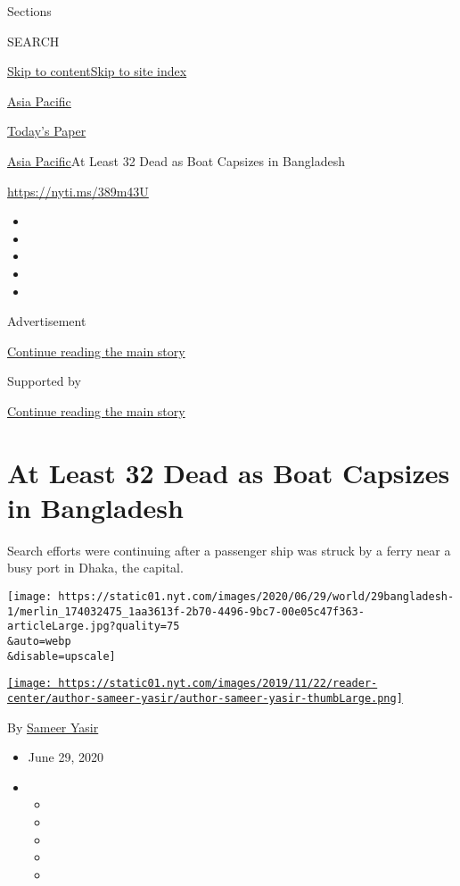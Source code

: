 Sections

SEARCH

\protect\hyperlink{site-content}{Skip to
content}\protect\hyperlink{site-index}{Skip to site index}

\href{https://www.nytimes.com/section/world/asia}{Asia Pacific}

\href{https://myaccount.nytimes.com/auth/login?response_type=cookie\&client_id=vi}{}

\href{https://www.nytimes.com/section/todayspaper}{Today's Paper}

\href{/section/world/asia}{Asia Pacific}\textbar{}At Least 32 Dead as
Boat Capsizes in Bangladesh

\url{https://nyti.ms/389m43U}

\begin{itemize}
\item
\item
\item
\item
\item
\end{itemize}

Advertisement

\protect\hyperlink{after-top}{Continue reading the main story}

Supported by

\protect\hyperlink{after-sponsor}{Continue reading the main story}

\hypertarget{at-least-32-dead-as-boat-capsizes-in-bangladesh}{%
\section{At Least 32 Dead as Boat Capsizes in
Bangladesh}\label{at-least-32-dead-as-boat-capsizes-in-bangladesh}}

Search efforts were continuing after a passenger ship was struck by a
ferry near a busy port in Dhaka, the capital.

\texttt{[image: https://static01.nyt.com/images/2020/06/29/world/29bangladesh-1/merlin\_174032475\_1aa3613f-2b70-4496-9bc7-00e05c47f363-articleLarge.jpg?quality=75\\\&auto=webp\\\&disable=upscale]}

\href{https://www.nytimes.com/by/sameer-yasir}{\texttt{[image: https://static01.nyt.com/images/2019/11/22/reader-center/author-sameer-yasir/author-sameer-yasir-thumbLarge.png]}}

By \href{https://www.nytimes.com/by/sameer-yasir}{Sameer Yasir}

\begin{itemize}
\item
  June 29, 2020
\item
  \begin{itemize}
  \item
  \item
  \item
  \item
  \item
  \end{itemize}
\end{itemize}

